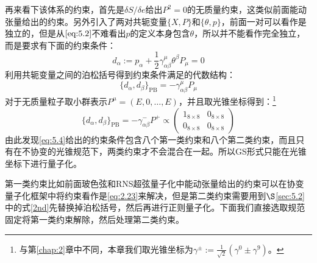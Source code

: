 再来看下该体系的约束，首先是$\delta S/\delta e$给出$P^2=0$的无质量约束，这类似前面能动张量给出的约束。另外引入了两对共轭变量$\{X,P\}$和$\{\theta,p\}$，前面一对可以看作是独立的，但是从$\ref{eq:5.2}$不难看出$p$的定义本身包含$\theta$，所以并不能看作完全独立，而是要求有下面的约束条件：
\begin{equation}
	d_\alpha:=p_\alpha+\frac{1}{2}\gamma_{\alpha\beta}^\mu\theta^\beta P_\mu=0
\end{equation}
利用共轭变量之间的泊松括号得到约束条件满足的代数结构：
\begin{equation}
	\label{eq:5.4}
	\{d_\alpha,d_\beta\}_{\mathrm{PB}}=-\gamma_{\alpha\beta}^\mu P_\mu
\end{equation}
对于无质量粒子取小群表示$P^\mu=(E,0,\ldots,E)$，并且取光锥坐标得到：\footnote{与第\ref{chap:2}章中不同，本章我们取光锥坐标为$\gamma^{\pm}:=\frac{1}{\sqrt{2}}(\gamma^0\pm\gamma^9)$。}
\begin{equation}
	\label{eq:5.5}
	\{d_\alpha,d_\beta\}_{\mathrm{PB}}=-\gamma_{\alpha\beta}^-P^+\propto\begin{pmatrix}{1}_{8\times8}&{0}_{8\times8}\\{0}_{8\times8}&{0}_{8\times8}\end{pmatrix}
\end{equation}
由此发现\ref{eq:5.4}给出的约束条件包含八个第一类约束和八个第二类约束，而且只有在不协变的光锥规范下，两类约束才不会混合在一起。所以GS形式只能在光锥坐标下进行量子化。

第一类约束比如前面玻色弦和RNS超弦量子化中能动张量给出的约束可以在协变量子化框架中将约束看作是\ref{eq:2.23}来解决，但是第二类约束需要用到$\S$\ref{sec:5.2}中的式\ref{2nd}先替换掉泊松括号，然后再进行正则量子化。下面我们直接选取规范固定将第一类约束解除，然后处理第二类约束。

